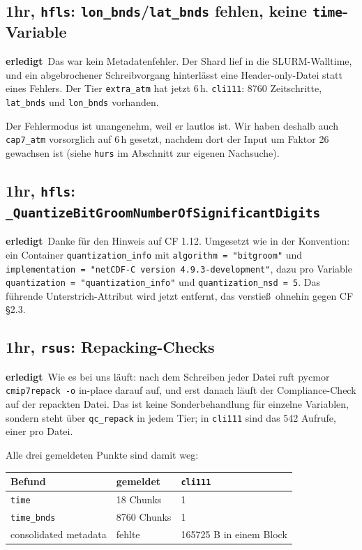 \documentclass[11pt,a4paper]{article}
\newcommand{\code}[1]{\texttt{\small #1}}
\newcommand{\ok}{\textcolor{green!45!black}{\textbf{erledigt}}}
\begin{document}
\subsection*{1hr, \code{hfls}: \code{lon\_bnds}/\code{lat\_bnds} fehlen, keine \code{time}-Variable}
\ok\ Das war kein Metadatenfehler. Der Shard lief in die SLURM-Walltime, und ein
abgebrochener Schreibvorgang hinterl\"asst eine Header-only-Datei statt eines Fehlers.
Der Tier \code{extra\_atm} hat jetzt 6\,h. \code{cli111}: 8760 Zeitschritte,
\code{lat\_bnds} und \code{lon\_bnds} vorhanden.

Der Fehlermodus ist unangenehm, weil er lautlos ist. Wir haben deshalb auch
\code{cap7\_atm} vorsorglich auf 6\,h gesetzt, nachdem dort der Input um Faktor 26
gewachsen ist (siehe \code{hurs} im Abschnitt zur eigenen Nachsuche).

\subsection*{1hr, \code{hfls}: \code{\_QuantizeBitGroomNumberOfSignificantDigits}}
\ok\ Danke f\"ur den Hinweis auf CF 1.12. Umgesetzt wie in der Konvention:
ein Container \code{quantization\_info} mit \code{algorithm = "bitgroom"} und
\code{implementation = "netCDF-C version 4.9.3-development"}, dazu pro Variable
\code{quantization = "quantization\_info"} und \code{quantization\_nsd = 5}.
Das f\"uhrende Unterstrich-Attribut wird jetzt entfernt, das verstie\ss\ ohnehin
gegen CF \S2.3.

\subsection*{1hr, \code{rsus}: Repacking-Checks}
\ok\ Wie es bei uns l\"auft: nach dem Schreiben jeder Datei ruft pycmor
\code{cmip7repack -o} in-place darauf auf, und erst danach l\"auft der
Compliance-Check auf der repackten Datei. Das ist keine Sonderbehandlung f\"ur
einzelne Variablen, sondern steht \"uber \code{qc\_repack} in jedem Tier; in
\code{cli111} sind das 542 Aufrufe, einer pro Datei.

Alle drei gemeldeten Punkte sind damit weg:

\begin{center}
\begin{tabular}{lll}
\toprule
\textbf{Befund} & \textbf{gemeldet} & \textbf{\code{cli111}} \\
\midrule
\code{time} & 18 Chunks & 1 \\
\code{time\_bnds} & 8760 Chunks & 1 \\
consolidated metadata & fehlte & 165725 B in einem Block \\
\bottomrule
\end{tabular}
\end{center}
\end{document}
